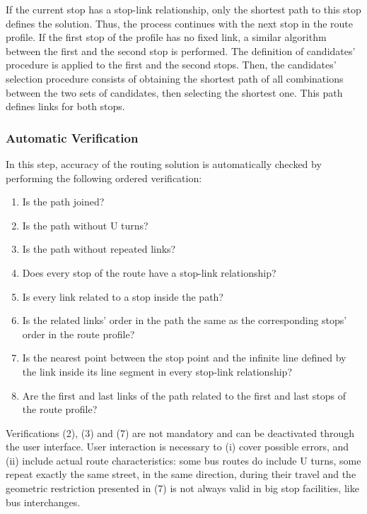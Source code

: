 If the current stop has a stop-link relationship, only the shortest path to this stop defines the solution. Thus, the process continues with the next stop in the route profile. If the first stop of the profile has no fixed link, a similar algorithm between the first and the second stop is performed. The definition of candidates' procedure is applied to the first and the second stops. Then, the candidates' selection procedure consists of obtaining the shortest path of all combinations between the two sets of candidates, then selecting the shortest one. This path defines links for both stops.

\subsubsection{Automatic Verification}
In this step, accuracy of the routing solution is automatically checked by performing the following ordered verification:
%
\begin{enumerate}\styleEnumerate
\item Is the path joined?
\item Is the path without U turns?
\item Is the path without repeated links?
\item Does every stop of the route have a stop-link relationship?
\item Is every link related to a stop inside the path?
\item Is the related links' order in the path the same as the corresponding stops' order in the route profile?
\item Is the nearest point between the stop point and the infinite line defined by the link inside its line segment in every stop-link relationship?
\item Are the first and last links of the path related to the first and last  stops of the route profile?
\end{enumerate}

Verifications (2), (3) and (7) are not mandatory and can be deactivated through the user interface. User interaction is necessary to (i) cover possible errors, and (ii) include actual route characteristics: some bus routes do include U turns, some repeat exactly the same street, in the same direction, during their travel and the geometric restriction presented in (7) is not always valid in big stop facilities, like bus interchanges.

